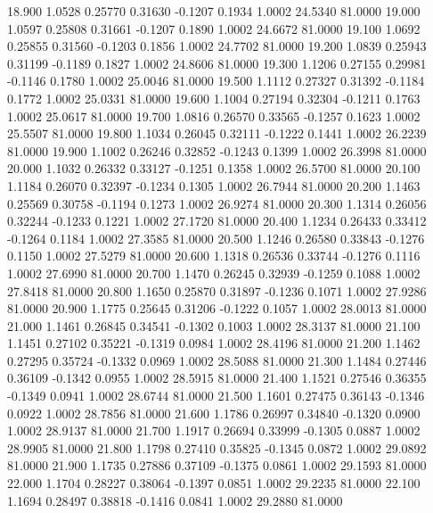   18.900   1.0528   0.25770   0.31630  -0.1207   0.1934   1.0002  24.5340  81.0000
  19.000   1.0597   0.25808   0.31661  -0.1207   0.1890   1.0002  24.6672  81.0000
  19.100   1.0692   0.25855   0.31560  -0.1203   0.1856   1.0002  24.7702  81.0000
  19.200   1.0839   0.25943   0.31199  -0.1189   0.1827   1.0002  24.8606  81.0000
  19.300   1.1206   0.27155   0.29981  -0.1146   0.1780   1.0002  25.0046  81.0000
  19.500   1.1112   0.27327   0.31392  -0.1184   0.1772   1.0002  25.0331  81.0000
  19.600   1.1004   0.27194   0.32304  -0.1211   0.1763   1.0002  25.0617  81.0000
  19.700   1.0816   0.26570   0.33565  -0.1257   0.1623   1.0002  25.5507  81.0000
  19.800   1.1034   0.26045   0.32111  -0.1222   0.1441   1.0002  26.2239  81.0000
  19.900   1.1002   0.26246   0.32852  -0.1243   0.1399   1.0002  26.3998  81.0000
  20.000   1.1032   0.26332   0.33127  -0.1251   0.1358   1.0002  26.5700  81.0000
  20.100   1.1184   0.26070   0.32397  -0.1234   0.1305   1.0002  26.7944  81.0000
  20.200   1.1463   0.25569   0.30758  -0.1194   0.1273   1.0002  26.9274  81.0000
  20.300   1.1314   0.26056   0.32244  -0.1233   0.1221   1.0002  27.1720  81.0000
  20.400   1.1234   0.26433   0.33412  -0.1264   0.1184   1.0002  27.3585  81.0000
  20.500   1.1246   0.26580   0.33843  -0.1276   0.1150   1.0002  27.5279  81.0000
  20.600   1.1318   0.26536   0.33744  -0.1276   0.1116   1.0002  27.6990  81.0000
  20.700   1.1470   0.26245   0.32939  -0.1259   0.1088   1.0002  27.8418  81.0000
  20.800   1.1650   0.25870   0.31897  -0.1236   0.1071   1.0002  27.9286  81.0000
  20.900   1.1775   0.25645   0.31206  -0.1222   0.1057   1.0002  28.0013  81.0000
  21.000   1.1461   0.26845   0.34541  -0.1302   0.1003   1.0002  28.3137  81.0000
  21.100   1.1451   0.27102   0.35221  -0.1319   0.0984   1.0002  28.4196  81.0000
  21.200   1.1462   0.27295   0.35724  -0.1332   0.0969   1.0002  28.5088  81.0000
  21.300   1.1484   0.27446   0.36109  -0.1342   0.0955   1.0002  28.5915  81.0000
  21.400   1.1521   0.27546   0.36355  -0.1349   0.0941   1.0002  28.6744  81.0000
  21.500   1.1601   0.27475   0.36143  -0.1346   0.0922   1.0002  28.7856  81.0000
  21.600   1.1786   0.26997   0.34840  -0.1320   0.0900   1.0002  28.9137  81.0000
  21.700   1.1917   0.26694   0.33999  -0.1305   0.0887   1.0002  28.9905  81.0000
  21.800   1.1798   0.27410   0.35825  -0.1345   0.0872   1.0002  29.0892  81.0000
  21.900   1.1735   0.27886   0.37109  -0.1375   0.0861   1.0002  29.1593  81.0000
  22.000   1.1704   0.28227   0.38064  -0.1397   0.0851   1.0002  29.2235  81.0000
  22.100   1.1694   0.28497   0.38818  -0.1416   0.0841   1.0002  29.2880  81.0000
